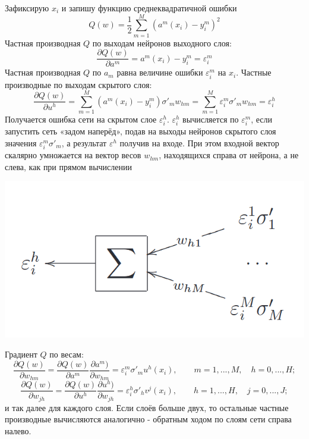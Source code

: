 Зафиксирую \(x_i\) и запишу функцию среднеквадратичной ошибки
\begin{equation}
Q(w) = \frac{1}{2}\sum_{m=1}^M \left(a^m(x_i) - y^m_i \right)^2
\end{equation}
Частная производная \(Q\) по выходам нейронов выходного слоя:
\[
\frac{\partial Q(w)}{\partial a^m} = a^m(x_i) - y^m_i = \varepsilon^m_i
\]
Частная производная \(Q\) по \(a_m\) равна величине ошибки \(\varepsilon^m_i\) на \(x_i\). Частные производные по выходам скрытого слоя:
\[
\frac{\partial Q(w)}{\partial u^h} = \sum_{m=1}^M \left(a^m(x_i) - y^m_i \right)\sigma'_m w_{hm} = \sum_{m=1}^M \varepsilon^m_i \sigma'_m w_{hm} = \varepsilon^h_i
\]
Получается ошибка сети на скрытом слое \(\varepsilon^h_i\). \(\varepsilon^h_i\) вычисляется по \(\varepsilon^m_i\), если запустить сеть «задом наперёд», подав на выходы нейронов скрытого слоя значения \(\varepsilon^m_i \sigma'_m\), а результат \(\varepsilon^h\) получив на входе. При этом входной вектор скалярно умножается на вектор весов \(w_{hm}\), находящихся справа от нейрона, а не слева, как при прямом вычислении 

\begin{minipage}{0.4\textwidth}
  \includegraphics[width=\textwidth]{images/nn1.png}
\end{minipage}
\par
Градиент \(Q\) по весам:
\begin{equation}
\frac{\partial Q(w)}{\partial w_{hm}} = \frac{\partial Q(w)}{\partial a^m}  \frac{\partial a^m)}{\partial w_{hm}} = \varepsilon^m_i \sigma'_m u^h(x_i), \qquad m=1,...,M, \quad h=0,...,H;
\end{equation}
\begin{equation}
\frac{\partial Q(w)}{\partial w_{jh}} = \frac{\partial Q(w)}{\partial u^h}  \frac{\partial u^h)}{\partial w_{jh}} = \varepsilon^h_i \sigma'_h v^j(x_i), \qquad h=1,...,H, \quad j=0,...,J;
\end{equation}
и так далее для каждого слоя. Если слоёв больше двух, то остальные частные производные вычисляются аналогично - обратным ходом по слоям сети справа налево.

